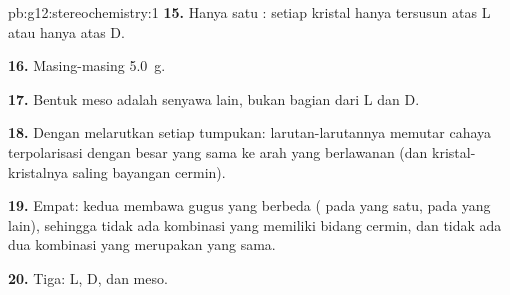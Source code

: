 \begin{solution}{pb:g12:stereochemistry:1}
\textbf{15.} Hanya satu : setiap kristal hanya tersusun atas L
atau hanya atas D.

\textbf{16.} Masing-masing \qty{5.0}{g}.

\textbf{17.} Bentuk meso adalah senyawa lain, bukan bagian dari  L dan D.

\textbf{18.} Dengan melarutkan setiap tumpukan: larutan-larutannya
memutar cahaya terpolarisasi dengan besar yang sama ke arah yang
berlawanan (dan kristal-kristalnya saling bayangan cermin).

\textbf{19.} Empat: kedua  membawa gugus yang berbeda
( pada yang satu,  pada yang lain), sehingga tidak ada
kombinasi yang memiliki bidang cermin, dan tidak ada dua kombinasi yang
merupakan  yang sama.

\textbf{20.} Tiga: L, D, dan meso.
\end{solution}
